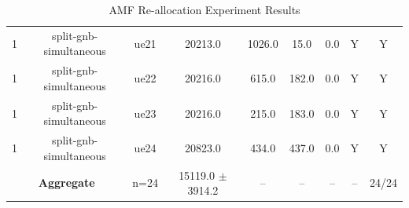 \begin{table}[ht]
\begin{tabular}{|c|c|c|c|c|c|c|c|c|}
1 & split-gnb-simultaneous & ue21 & 20213.0 & 1026.0 & 15.0 & 0.0 & Y & Y \\
1 & split-gnb-simultaneous & ue22 & 20216.0 & 615.0 & 182.0 & 0.0 & Y & Y \\
1 & split-gnb-simultaneous & ue23 & 20216.0 & 215.0 & 183.0 & 0.0 & Y & Y \\
1 & split-gnb-simultaneous & ue24 & 20823.0 & 434.0 & 437.0 & 0.0 & Y & Y \\
\multicolumn{2}{|c|}{\textbf{Aggregate}} & n=24 & 15119.0 $\pm$ 3914.2 & -- & -- & -- & -- & 24/24 \\
\hline
\end{tabular}
\caption{AMF Re-allocation Experiment Results}
\label{tab:amf_realloc}
\end{table}
